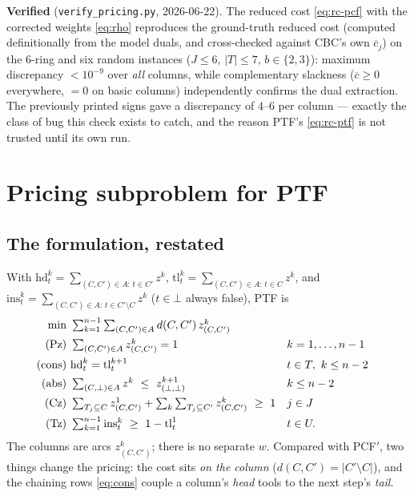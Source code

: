 \documentclass[11pt,a4paper]{article}
\theoremstyle{plain}
\theoremstyle{definition}
\newcommand{\hd}{\mathrm{hd}}
\newcommand{\tl}{\mathrm{tl}}
\newcommand{\ins}{\mathrm{ins}}
\begin{document}
\begin{warnbox}
\textbf{Verified} (\texttt{verify\_pricing.py}, 2026-06-22). The reduced cost \eqref{eq:rc-pcf}
with the corrected weights \eqref{eq:rho} reproduces the ground-truth reduced cost (computed
definitionally from the model duals, and cross-checked against CBC's own $\overline{c}_j$) on the
$6$-ring and six random instances ($J\le6$, $|T|\le7$, $b\in\{2,3\}$): maximum discrepancy
$<10^{-9}$ over \emph{all} columns, while complementary slackness ($\overline{c}\ge0$ everywhere,
$=0$ on basic columns) independently confirms the dual extraction. The previously printed signs
gave a discrepancy of $4$--$6$ per column --- exactly the class of bug this check exists to catch,
and the reason PTF's \eqref{eq:rc-ptf} is not trusted until its own run.
\end{warnbox}

\section{Pricing subproblem for PTF}\label{sec:priceptf}
\subsection{The formulation, restated}
With $\hd_t^k=\sum_{(C,C')\in A:\,t\in C'}z^k$, $\tl_t^k=\sum_{(C,C')\in A:\,t\in C}z^k$, and
$\ins_t^k=\sum_{(C,C')\in A:\,t\in C'\setminus C}z^k$ ($t\in\bot$ always false), PTF is
\begin{align}
  \min\ & \textstyle\sum_{k=1}^{n-1}\sum_{(C,C')\in A} d(C,C')\,z^k_{(C,C')} \notag\\
  \text{(Pz)}\ & \textstyle\sum_{(C,C')\in A} z^k_{(C,C')} = 1 && k=1,\dots,n-1 \label{eq:Pz}\\
  \text{(cons)}\ & \hd_t^k = \tl_t^{k+1} && t\in T,\ k\le n-2 \label{eq:cons}\\
  \text{(abs)}\ & \textstyle\sum_{(C,\bot)\in A} z^k \ \le\ z^{k+1}_{(\bot,\bot)} && k\le n-2 \label{eq:abs}\\
  \text{(Cz)}\ & \textstyle\sum_{T_j\subseteq C} z^1_{(C,C')}+\sum_{k}\sum_{T_j\subseteq C'} z^k_{(C,C')} \ \ge\ 1 && j\in J \label{eq:Cz}\\
  \text{(Tz)}\ & \textstyle\sum_{k=1}^{n-1}\ins_t^k \ \ge\ 1-\tl_t^1 && t\in U. \label{eq:Tz}
\end{align}
The columns are arcs $z^k_{(C,C')}$; there is no separate $w$. Compared with PCF$'$, two things
change the pricing: the cost sits \emph{on the column} ($d(C,C')=|C'\setminus C|$), and the
chaining rows \eqref{eq:cons} couple a column's \emph{head} tools to the next step's \emph{tail}.
\end{document}

